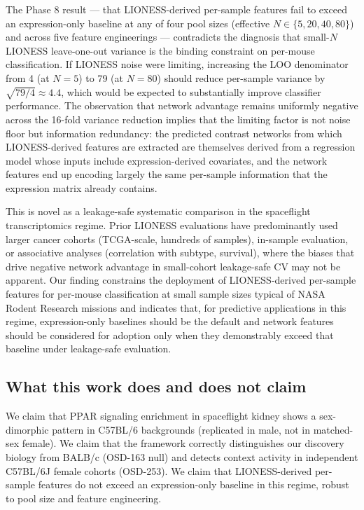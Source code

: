 \documentclass[11pt]{article}
\begin{document}
The Phase 8 result --- that LIONESS-derived per-sample features fail to exceed an expression-only baseline at any of four pool sizes (effective $N\in\{5,20,40,80\}$) and across five feature engineerings --- contradicts the diagnosis that small-$N$ LIONESS leave-one-out variance is the binding constraint on per-mouse classification. If LIONESS noise were limiting, increasing the LOO denominator from 4 (at $N{=}5$) to 79 (at $N{=}80$) should reduce per-sample variance by $\sqrt{79/4} \approx 4.4$, which would be expected to substantially improve classifier performance. The observation that network advantage remains uniformly negative across the 16-fold variance reduction implies that the limiting factor is not noise floor but information redundancy: the predicted contrast networks from which LIONESS-derived features are extracted are themselves derived from a regression model whose inputs include expression-derived covariates, and the network features end up encoding largely the same per-sample information that the expression matrix already contains.

This is novel as a leakage-safe systematic comparison in the spaceflight transcriptomics regime. Prior LIONESS evaluations have predominantly used larger cancer cohorts (TCGA-scale, hundreds of samples), in-sample evaluation, or associative analyses (correlation with subtype, survival), where the biases that drive negative network advantage in small-cohort leakage-safe CV may not be apparent. Our finding constrains the deployment of LIONESS-derived per-sample features for per-mouse classification at small sample sizes typical of NASA Rodent Research missions and indicates that, for predictive applications in this regime, expression-only baselines should be the default and network features should be considered for adoption only when they demonstrably exceed that baseline under leakage-safe evaluation.

\subsection{What this work does and does not claim}

We claim that PPAR signaling enrichment in spaceflight kidney shows a sex-dimorphic pattern in C57BL/6 backgrounds (replicated in male, not in matched-sex female). We claim that the framework correctly distinguishes our discovery biology from BALB/c (OSD-163 null) and detects context activity in independent C57BL/6J female cohorts (OSD-253). We claim that LIONESS-derived per-sample features do not exceed an expression-only baseline in this regime, robust to pool size and feature engineering.
\end{document}
